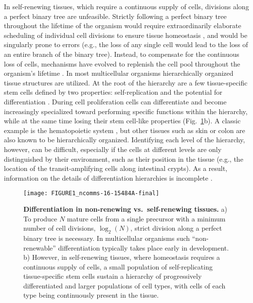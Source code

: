 \documentclass[aps,singlecolumn]{revtex4-1}
\begin{document}
In self-renewing tissues, which require a continuous supply of cells,
divisions along a perfect binary tree are unfeasible. Strictly following
a perfect binary tree throughout the lifetime of the organism would require
extraordinarily elaborate scheduling of individual cell divisions to
ensure tissue homeostasis \cite{Morris:2014}, and would be singularly
prone to errors (e.g., the loss of any single cell would lead to the
loss of an entire branch of the binary tree). Instead, to compensate
for the continuous loss of cells, mechanisms have evolved to replenish
the cell pool throughout the organism's lifetime \cite{Pardee:1989}. In
most multicellular organisms hierarchically organized tissue structures
are utilized. At the root of the hierarchy are a few tissue-specific
stem cells defined by two properties: self-replication and the
potential for differentiation \cite{Till:1961,McCulloch:2005}. During
cell proliferation cells can differentiate and become increasingly
specialized toward performing specific functions within the hierarchy,
while at the same time losing their stem cell-like properties
(Fig.~\ref{fig1}b). A classic example is the hematopoietic
system \cite{Michor:2005,Dingli:2007}, but other tissues such as skin
\cite{Tumbar:2004} or colon \cite{Barker:2007,Potten:2009} are also
known to be hierarchically organized. Identifying each level of the
hierarchy, however, can be difficult, especially if the cells at
different levels are only distinguished by their environment, such as
their position in the tissue (e.g., the location of the
transit-amplifying cells along intestinal crypts). As a result,
information on the details of differentiation hierarchies is incomplete
\cite{Rossi:2008,Vermeulen:2013,Sutherland:2015}.

\begin{figure}
\centerline{\texttt{[image: FIGURE1\_ncomms-16-15484A-final]}}
\caption{
{\bf Differentiation in non-renewing vs.\ self-renewing tissues.}
%
a) To produce $N$ mature cells from a single precursor with a minimum
number of cell divisions, $\log_2(N)$, strict division along a perfect
binary tree is necessary. In multicellular organisms such ``non-renewable''
differentiation typically takes place early in development. b) However, in
self-renewing tissues, where homeostasis requires a continuous supply
of cells, a small population of self-replicating tissue-specific stem
cells sustain a hierarchy of progressively differentiated and larger
populations of cell types, with cells of each type being continuously
present in the tissue.
%
}
\label{fig1}
\end{figure}
\end{document}
